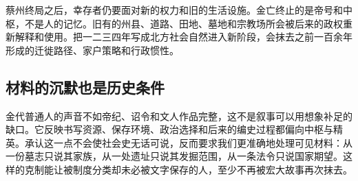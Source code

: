 蔡州终局之后，幸存者仍要面对新的权力和旧的生活设施。金亡终止的是帝号和中枢，不是人的记忆。旧有的州县、道路、田地、墓地和宗教场所会被后来的政权重新解释和使用。把一二三四年写成北方社会自然进入新阶段，会抹去之前一百余年形成的迁徙路径、家户策略和行政惯性。

\subsection{材料的沉默也是历史条件}

金代普通人的声音不如帝纪、诏令和文人作品完整，这不是叙事可以用想象补足的缺口。它反映书写资源、保存环境、政治选择和后来的编史过程都偏向中枢与精英。承认这一点不会使社会史无话可说，反而要求我们更准确地处理可见材料：从一份墓志只说其家族，从一处遗址只说其发掘范围，从一条法令只说国家期望。这样的克制能让被制度分类却未必被文字保存的人，至少不再被宏大故事再次抹去。
